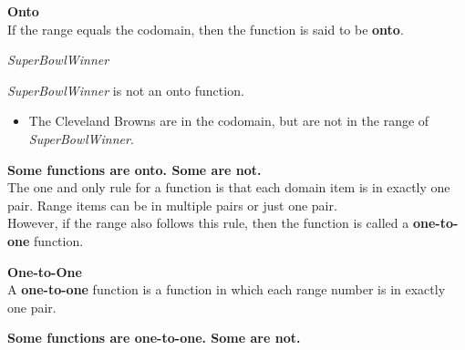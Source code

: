 \documentclass{ximera}
\begin{document}
\begin{definition} \textbf{\textcolor{green!50!black}{Onto}} \\

If the range equals the codomain, then the function is said to be \textbf{onto}.

\end{definition}









\begin{example} \textit{SuperBowlWinner}


\textit{SuperBowlWinner} is not an onto function.


\begin{itemize}
\item The Cleveland Browns are in the codomain, but are not in the range of \textit{SuperBowlWinner}.  
\end{itemize}

\end{example}







\textbf{\textcolor{blue!55!black}{Some functions are onto. Some are not.}}  \\




The one and only rule for a function is that each domain item is in exactly one pair.  Range items can be in multiple pairs or just one pair. \\

However, if the range also follows this rule, then the function is called a \textbf{one-to-one} function.



\begin{definition} \textbf{\textcolor{green!50!black}{One-to-One}} \\

A \textbf{one-to-one} function is a function in which each range number is in exactly one pair.

\end{definition}




\textbf{\textcolor{blue!55!black}{Some functions are one-to-one. Some are not.}}  \\
\end{document}
